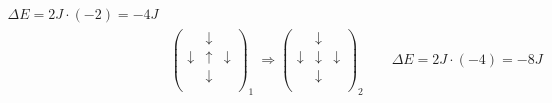 \begin{align*}
    \Delta E = 2J\cdot(-2) = -4J& \\
    &\begin{pmatrix} &\downarrow&\\ \downarrow&\uparrow&\downarrow\\ &\downarrow&\\\end{pmatrix}_1 \ \Longrightarrow
    \begin{pmatrix} &\downarrow&\\ \downarrow&\downarrow&\downarrow\\ &\downarrow&\\\end{pmatrix}_2 \qquad
    \Delta E = 2J\cdot(-4) = -8J& \\
\end{align*}

